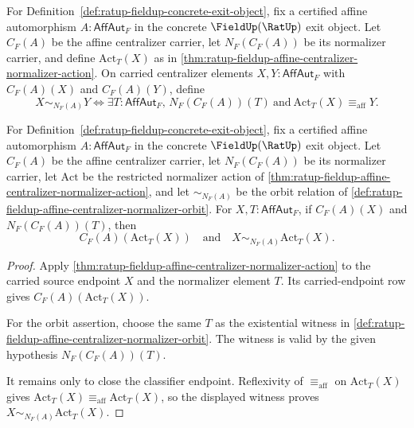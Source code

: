 \begin{definition}
\label{def:ratup-fieldup-affine-centralizer-normalizer-orbit}
For Definition~\ref{def:ratup-fieldup-concrete-exit-object}, fix a certified
affine automorphism $A:\mathsf{AffAut}_F$ in the concrete $\FieldUp(\RatUp)$
exit object. Let $C_F(A)$ be the affine centralizer carrier, let
$N_F(C_F(A))$ be its normalizer carrier, and define $\mathrm{Act}_T(X)$ as in
\autoref{thm:ratup-fieldup-affine-centralizer-normalizer-action}. On carried
centralizer elements $X,Y:\mathsf{AffAut}_F$ with $C_F(A)(X)$ and $C_F(A)(Y)$,
define
$$
X\sim_{N_F(A)}Y
\Longleftrightarrow
\exists T:\mathsf{AffAut}_F,\,
N_F(C_F(A))(T)\ \text{and}\ \mathrm{Act}_T(X)\equiv_{\mathrm{aff}}Y.
$$
\end{definition}

\begin{theorem}
\label{thm:ratup-fieldup-affine-centralizer-normalizer-action-orbit-coverage}
For Definition~\ref{def:ratup-fieldup-concrete-exit-object}, fix a certified
affine automorphism $A:\mathsf{AffAut}_F$ in the concrete $\FieldUp(\RatUp)$
exit object. Let $C_F(A)$ be the affine centralizer carrier, let
$N_F(C_F(A))$ be its normalizer carrier, let $\mathrm{Act}$ be the restricted
normalizer action of
\autoref{thm:ratup-fieldup-affine-centralizer-normalizer-action}, and let
$\sim_{N_F(A)}$ be the orbit relation of
\autoref{def:ratup-fieldup-affine-centralizer-normalizer-orbit}. For
$X,T:\mathsf{AffAut}_F$, if $C_F(A)(X)$ and $N_F(C_F(A))(T)$, then
$$
C_F(A)(\mathrm{Act}_T(X))
\quad\text{and}\quad
X\sim_{N_F(A)}\mathrm{Act}_T(X).
$$
\end{theorem}
\begin{proof}
Apply
\autoref{thm:ratup-fieldup-affine-centralizer-normalizer-action} to the carried
source endpoint $X$ and the normalizer element $T$. Its carried-endpoint row
gives $C_F(A)(\mathrm{Act}_T(X))$.

For the orbit assertion, choose the same $T$ as the existential witness in
\autoref{def:ratup-fieldup-affine-centralizer-normalizer-orbit}. The witness is
valid by the given hypothesis $N_F(C_F(A))(T)$.

It remains only to close the classifier endpoint. Reflexivity of
$\equiv_{\mathrm{aff}}$ on $\mathrm{Act}_T(X)$ gives
$\mathrm{Act}_T(X)\equiv_{\mathrm{aff}}\mathrm{Act}_T(X)$, so the displayed
witness proves $X\sim_{N_F(A)}\mathrm{Act}_T(X)$.
\end{proof}

